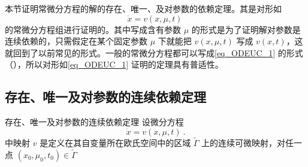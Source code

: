 
本节证明常微分方程的解的存在、唯一、及对参数的依赖定理。其是对形如
\begin{equation}\label{eq_ODEUC_1}
\dot x=v(x,\mu,t)~
\end{equation}
的常微分方程组进行证明的。其中写成含有参数 $\mu$ 的形式是为了证明解对参数是连续依赖的，只需假定在某个固定参数 $\mu$ 下就能把 $v(x,\mu,t)$ 写成 $v(x,t)$，这就回到了以前常见的形式。一般的常微分方程都可以写成\autoref{eq_ODEUC_1} 的形式（），所以对形如\autoref{eq_ODEUC_1} 证明的定理具有普适性。
\subsection{存在、唯一及对参数的连续依赖定理}
\begin{theorem}{存在、唯一及对参数的连续依赖定理}
设微分方程
\begin{equation}
\dot x=v(x,\mu,t)~.
\end{equation}
中映射 $v$ 是定义在其自变量所在欧氏空间中的区域 $\tilde\Gamma$ 上的连续可微映射，对任一点 $(x_0,\mu_0,t_0)\in\tilde\Gamma$
\end{theorem}

